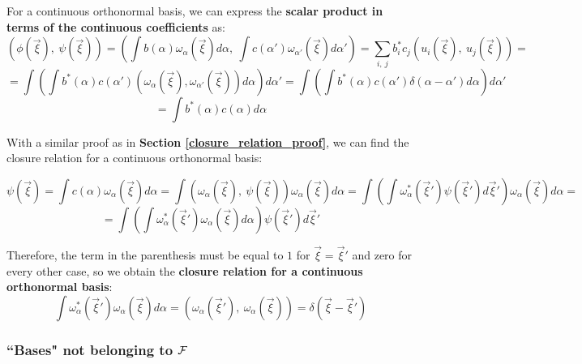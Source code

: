For a continuous orthonormal basis, we can express the \textbf{scalar product in terms of the continuous coefficients} as:
\begin{equation*}
    \left(\phi(\vec{\xi}), \ \psi(\vec{\xi})\right) = \left(\int b(\alpha) \omega_\alpha(\vec{\xi})d\alpha, \ \int c(\alpha') \omega_{\alpha'}(\vec{\xi})d\alpha'\right) = \sum_{i, \ j} b^*_i c_j \left(u_i(\vec{\xi}), \ u_j(\vec{\xi})\right) = 
\end{equation*}
\begin{equation*}
    = \int\left(\int b^*(\alpha)c(\alpha') (\omega_\alpha(\vec{\xi}), \omega_{\alpha'}(\vec{\xi}))d\alpha\right) d\alpha' = \int\left(\int b^*(\alpha)c(\alpha') \delta(\alpha-\alpha') d\alpha\right) d\alpha'
\end{equation*}
\begin{equation}
    = \int b^*(\alpha)c(\alpha) d\alpha
\end{equation}

With a similar proof as in \textbf{Section \ref{closure_relation_proof}}, we can find the closure relation for a continuous orthonormal basis:

\begin{equation*}
    \psi(\vec{\xi}) = \int c(\alpha) \omega_\alpha(\vec{\xi})d\alpha = \int \left(\omega_\alpha(\vec{\xi}), \ \psi(\vec{\xi})\right) \omega_\alpha(\vec{\xi})d\alpha = \int \left(\int \omega_\alpha^*(\vec{\xi}')\psi(\vec{\xi}')d\vec{\xi}'\right) \omega_\alpha(\vec{\xi})d\alpha  =    
\end{equation*}
\begin{equation}
    = \int \left(\int \omega_\alpha^*(\vec{\xi}')\omega_\alpha(\vec{\xi})d\alpha\right) \psi(\vec{\xi}')d\vec{\xi}'
\end{equation}

Therefore, the term in the parenthesis must be equal to $1$ for $\vec{\xi} =\vec{\xi}'$ and zero for every other case, so we obtain the \textbf{closure relation for a continuous orthonormal basis}:
\begin{equation}
    \int \omega_\alpha^*(\vec{\xi}')\omega_\alpha(\vec{\xi})d\alpha = \left( \omega_\alpha (\vec{\xi}'),\ \omega_\alpha (\vec{\xi}) \right) = \delta(\vec{\xi} - \vec{\xi}')
\end{equation}

\subsubsection{``Bases" not belonging to $\mathcal{F}$}

